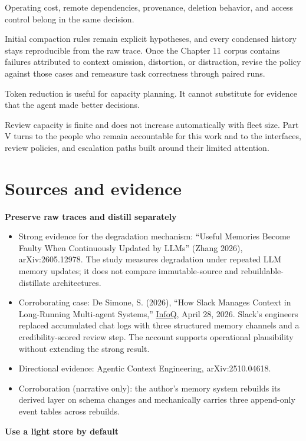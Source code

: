 Operating cost, remote dependencies, provenance, deletion behavior, and access control belong in the same decision.

Initial compaction rules remain explicit hypotheses, and every condensed history stays reproducible from the raw trace. Once the Chapter 11 corpus contains failures attributed to context omission, distortion, or distraction, revise the policy against those cases and remeasure task correctness through paired runs.

Token reduction is useful for capacity planning. It cannot substitute for evidence that the agent made better decisions.

Review capacity is finite and does not increase automatically with fleet size. Part V turns to the people who remain accountable for this work and to the interfaces, review policies, and escalation paths built around their limited attention.

\section*{Sources and evidence}

\textbf{Preserve raw traces and distill separately}

\begin{itemize}
\tightlist
\item
  Strong evidence for the degradation mechanism: ``Useful Memories Become Faulty When Continuously Updated by LLMs'' (Zhang 2026), arXiv:2605.12978. The study measures degradation under repeated LLM memory updates; it does not compare immutable-source and rebuildable-distillate architectures.
\item
  Corroborating case: De Simone, S. (2026), ``How Slack Manages Context in Long-Running Multi-agent Systems,'' \href{https://www.infoq.com/news/2026/04/slack-agent-context-management/}{InfoQ}, April 28, 2026. Slack's engineers replaced accumulated chat logs with three structured memory channels and a credibility-scored review step. The account supports operational plausibility without extending the strong result.
\item
  Directional evidence: Agentic Context Engineering, arXiv:2510.04618.
\item
  Corroboration (narrative only): the author's memory system rebuilds its derived layer on schema changes and mechanically carries three append-only event tables across rebuilds.
\end{itemize}

\textbf{Use a light store by default}


